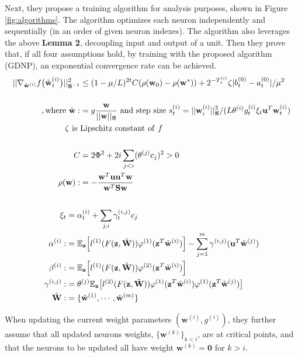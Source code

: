 \documentclass{article}
\begin{document}
Next, they propose a training algorithm for analysis purposes, shown in Figure \ref{fig:algorithms}. The algorithm optimizes each neuron independently and sequentially (in an order of given neuron indexes). The algorithm also leverages the above \textbf{Lemma 2}, decoupling input and output of a unit. Then they prove that, if all four assumptions hold, by training with the proposed algorithm (GDNP), an exponential convergence rate can be achieved.
\begin{align*}
    ||\nabla_{\Tilde{\textbf{w}}^{(i)}}f\big(\Tilde{\textbf{w}}_t^{(i)}\big)||^2_{\textbf{S}^{-1}}&\leq(1-\mu/L)^{2t}C(\rho(\textbf{w}_0)-\rho(\textbf{w}^*))+2^{-T_s^{(i)}}\zeta|b_t^{(0)}-a_t^{(0)}|/\mu^2\\\\
    \mathrm{, where\ }\Tilde{\textbf{w}}:&=g\frac{\textbf{w}}{||\textbf{w}||_{\textbf{S}}} \mathrm{\ and\ step\ size\ } s_t^{(i)}=||\textbf{w}_i^{(i)}||^3_{\textbf{S}}/(L\theta^{(i)}g_t^{(i)}\xi_t\textbf{u}^T\textbf{w}_t^{(i)})\\
    \zeta\mathrm{\ is\ }&\mathrm{Lipschitz\ constant\ of\ }f\\\\
    C&=2\Phi^2+2i\sum_{j<i}(\theta^{(j)}c_j)^2>0\\
    \rho(\textbf{w}):&=-\frac{\textbf{w}^T\textbf{uu}^T\textbf{w}}{\textbf{w}^T\textbf{Sw}}\\\\
\end{align*}
\begin{align*}
    \xi_t&=\alpha_t^{(i)}+\sum_{j,i}\gamma_t^{(i,j)}c_j\\
    \alpha^{(i)}:&=\mathbb{E}_{\textbf{z}}\Big[l^{(1)}(F(\textbf{z},\Tilde{\textbf{W}}))\varphi^{(1)}(\textbf{z}^T\Tilde{\textbf{w}}^{(i)})\Big]-\sum_{j=1}^m\gamma^{(i,j)}(\textbf{u}^T\Tilde{\textbf{w}}^{(j)})\\
    \beta^{(i)}:&=\mathbb{E}_{\textbf{z}}\Big[l^{(1)}(F(\textbf{z},\Tilde{\textbf{W}}))\varphi^{(2)}(\textbf{z}^T\Tilde{\textbf{w}}^{(i)})\Big]\\
    \gamma^{(i,j)}:&=\theta^{(j)}\mathbb{E}_{\textbf{z}}\big[l^{(2)}(F(\textbf{z},\Tilde{\textbf{W}}))\varphi^{(1)}(\textbf{z}^T\Tilde{\textbf{w}}^{(i)})\varphi^{(1)}(\textbf{z}^T\Tilde{\textbf{w}}^{(j)})\big]\\
    \Tilde{\textbf{W}}:&=\{\Tilde{\textbf{w}}^{(1)},\cdots,\Tilde{\textbf{w}}^{(m)}\}
\end{align*}

When updating the current weight parameters $(\textbf{w}^{(i)}, g^{(i)})$, they further assume that all updated neurons weights, $\{\textbf{w}^{(k)}\}_{k<i}$, are at critical points, and that the neurons to be updated all have weight $\textbf{w}^{(k)}=\textbf{0}$ for $k>i$.
\end{document}
